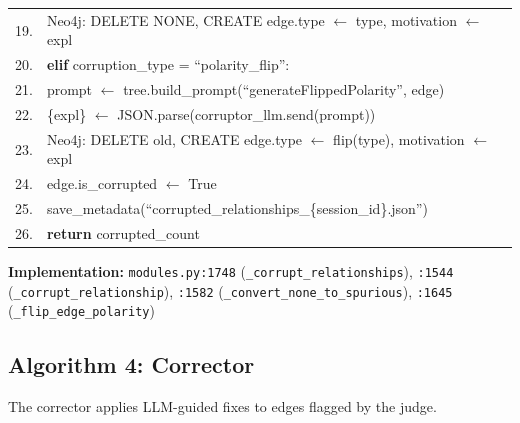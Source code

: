 \begin{table}[H]
\begin{tabular}{@{}r l@{}}
19. & \quad\quad Neo4j: DELETE NONE, CREATE edge.type $\leftarrow$ type, motivation $\leftarrow$ expl \\
20. & \quad \textbf{elif} corruption\_type = ``polarity\_flip'': \\
21. & \quad\quad prompt $\leftarrow$ tree.build\_prompt(``generateFlippedPolarity'', edge) \\
22. & \quad\quad \{expl\} $\leftarrow$ JSON.parse(corruptor\_llm.send(prompt)) \\
23. & \quad\quad Neo4j: DELETE old, CREATE edge.type $\leftarrow$ flip(type), motivation $\leftarrow$ expl \\
24. & \quad edge.is\_corrupted $\leftarrow$ True \\
25. & save\_metadata(``corrupted\_relationships\_\{session\_id\}.json'') \\
26. & \textbf{return} corrupted\_count \\
\bottomrule
\end{tabular}
\end{table}

\textbf{Implementation:} \texttt{modules.py:1748} (\texttt{\_corrupt\_relationships}), \texttt{:1544} (\texttt{\_corrupt\_relationship}), \texttt{:1582} (\texttt{\_convert\_none\_to\_spurious}), \texttt{:1645} (\texttt{\_flip\_edge\_polarity})

\subsection{Algorithm 4: Corrector}
\label{alg:corrector}

The corrector applies LLM-guided fixes to edges flagged by the judge.

